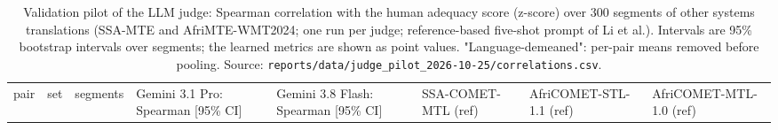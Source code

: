 \begin{table}[t]
\centering
\footnotesize
\setlength{\tabcolsep}{3pt}
\caption{Validation pilot of the LLM judge: Spearman correlation with the human adequacy score (z-score) over 300 segments of other systems\textquotesingle{} translations (SSA-MTE and AfriMTE-WMT2024; one run per judge; reference-based five-shot prompt of Li et al.). Intervals are 95\% bootstrap intervals over segments; the learned metrics are shown as point values. "Language-demeaned": per-pair means removed before pooling. Source: \texttt{reports/data/judge\_pilot\_2026-10-25/correlations.csv}.}
\label{tab:t_judge_pilot}
{\def\LTcaptype{none} %
\begin{tabular}{@{}
  >{\raggedright\arraybackslash}p{}
  >{\raggedright\arraybackslash}p{}
  >{\raggedleft\arraybackslash}p{}
  >{\raggedleft\arraybackslash}p{}
  >{\raggedleft\arraybackslash}p{}
  >{\raggedleft\arraybackslash}p{}
  >{\raggedleft\arraybackslash}p{}
  >{\raggedleft\arraybackslash}p{}@{}}
\toprule
\begin{minipage}[b]{\linewidth}\raggedright
pair
\end{minipage} & \begin{minipage}[b]{\linewidth}\raggedright
set
\end{minipage} & \begin{minipage}[b]{\linewidth}\raggedleft
segments
\end{minipage} & \begin{minipage}[b]{\linewidth}\raggedleft
Gemini 3.1 Pro: Spearman {[}95\% CI{]}
\end{minipage} & \begin{minipage}[b]{\linewidth}\raggedleft
Gemini 3.8 Flash: Spearman {[}95\% CI{]}
\end{minipage} & \begin{minipage}[b]{\linewidth}\raggedleft
SSA-COMET-MTL (ref)
\end{minipage} & \begin{minipage}[b]{\linewidth}\raggedleft
AfriCOMET-STL-1.1 (ref)
\end{minipage} & \begin{minipage}[b]{\linewidth}\raggedleft
AfriCOMET-MTL-1.0 (ref)

\end{minipage}
\end{tabular}}
\end{table}
